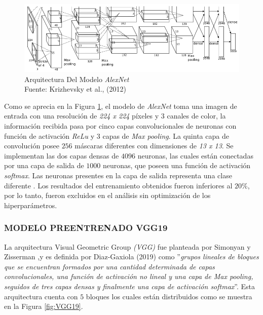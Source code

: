 \begin{figure}[ht]
	\centering
	\includegraphics[scale=0.75]{Figs/5.png}
	\caption{Arquitectura Del Modelo \textit{AlexNet} \\ Fuente: Krizhevsky et al., (2012)}
	\label{fig:AlexNet}
\end{figure}

Como se aprecia en la Figura \ref{fig:AlexNet}, el modelo de \textit{AlexNet} toma una imagen de entrada con una resolución de \textit{224 x 224} píxeles y $3$ canales de color, la información recibida pasa por cinco capas convolucionales de neuronas con función de activación \textit{ReLu} y $3$ capas de \textit{Max pooling}. La quinta capa de convolución posee $256$ máscaras diferentes con dimensiones de \textit{13 x 13}. Se implementan las dos capas densas de $4096$ neuronas, las cuales están conectadas  por una capa de salida de $1000$ neuronas, que poseen una función de activación \textit{softmax}. Las neuronas presentes en la capa de salida representa una clase diferente \cite{alex}. Los resultados del entrenamiento obtenidos fueron inferiores al $20\%$, por lo tanto, fueron excluidos en el análisis sin optimización de los hiperparámetros.


\subsubsection{\MakeUppercase{Modelo preentrenado VGG19}}

La arquitectura Visual Geometric Group \textit{(VGG)} fue planteada por Simonyan y Zisserman \cite{simonyan2014very},y es definida por Diaz-Gaxiola (2019) como ''\textit{grupos lineales de bloques que se encuentran formados por una cantidad determinada de capas convolucionales, una función de activación no lineal y una capa de \textit{Max pooling}, seguidos de tres capas densas y finalmente una capa de activación \textit{softmax}}''. Esta arquitectura cuenta con $5$ bloques los cuales están distribuidos como se muestra en la Figura \ref{fig:VGG19}.				

